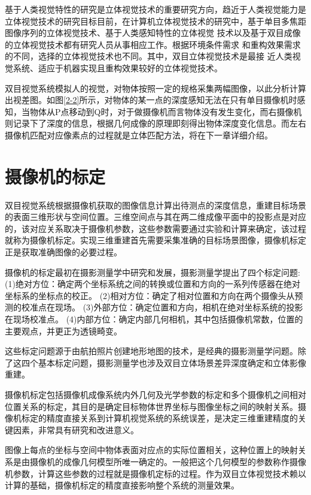 
基于人类视觉特性的研究是立体视觉技术的重要研究方向，趋近于人类视觉能力是立体视觉技术的研究目标目前，在计算机立体视觉技术的研究中，基于单目多焦距图像序列的立体视觉技术、基于人类感知特性的立体视觉
技术以及基于双目成像的立体视觉技术都有研究人员从事相应工作。根据环境条件需求
和重构效果需求的不同，选择的立体视觉技术也不同。其中，双目立体视觉技术是最接
近人类视觉系统、适应于机器实现且重构效果较好的立体视觉技术。

双目视觉系统模拟人的视觉，对物体按照一定的规格采集两幅图像，以此分析计算出视差图。如图\ref{2-2}所示，对物体的某一点的深度感知无法在只有单目摄像机时感知，当物体从P点移动到Q时，对于做摄像机而言物体没有发生变化，而右摄像机则记录下了深度的信息，根据几何成像的原理即刻得出物体深度变化信息。而左右摄像机匹配对应像素点的过程就是立体匹配方法，将在下一章详细介绍。


\section{摄像机的标定}

双目视觉系统根据摄像机获取的图像信息计算出待测点的深度信息，重建目标场景的表面三维形状与空间位置。三维空间点与其在两二维成像平面中的投影点是对应的，该对应关系取决于摄像机参数，这些参数需要通过实验和计算来确定，该过程就称为摄像机标定。实现三维重建首先需要采集准确的目标场景图像，摄像机标定正是获取准确图像的必要过程。

摄像机的标定最初在摄影测量学中研究和发展，摄影测量学提出了四个标定问题:
(1)绝对方位：确定两个坐标系统之间的转换或位置和方向的一系列传感器在绝对坐标系的坐标点的校正。
(2)相对方位：确定了相对位置和方向在两个摄像头从预测的校准点在现场。
(3)外部方位：确定位置和方向，相机在绝对坐标系统的投影在现场校准点。
(4)内部方位：确定内部几何相机，其中包括摄像机常数，位置的主要观点，并更正为透镜畸变。

这些标定问题源于由航拍照片创建地形地图的技术，是经典的摄影测量学问题。除了这四个基本标定问题，摄影测量学也涉及双目立体场景差异深度确定和立体影像重建。

摄像机标定包括摄像机成像系统内外几何及光学参数的标定和多个摄像机之间相对位置关系的标定，其目的是确定目标物体世界坐标与图像坐标之间的映射关系。摄像机标定的精度直接关系到计算机视觉系统的系统误差，是决定三维重建精度的关键因素，非常具有研究和改进意义。

图像上每点的坐标与空间中物体表面对应点的实际位置相关，这种位置上的映射关系是由摄像机的成像几何模型所唯一确定的。一般把这个几何模型的参数称作摄像机参数，计算这些参数的过程就是摄像机定标的过程。作为双目立体视觉技术赖以计算的基础，摄像机标定的精度直接影响整个系统的测量效果。



